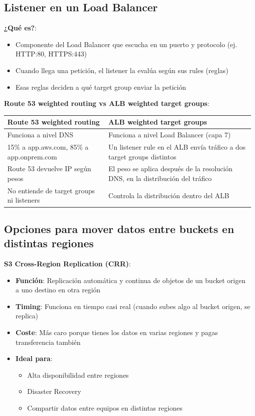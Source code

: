 \documentclass[12pt,a4paper]{report}
\begin{document}
\subsection{Listener en un Load Balancer}

\textbf{¿Qué es?}:
\begin{itemize}
    \item Componente del Load Balancer que escucha en un puerto y protocolo (ej. HTTP:80, HTTPS:443)
    \item Cuando llega una petición, el listener la evalúa según sus rules (reglas)
    \item Esas reglas deciden a qué target group enviar la petición
\end{itemize}

\textbf{Route 53 weighted routing vs ALB weighted target groups}:

\begin{center}
\begin{longtable}{|p{6cm}|p{7cm}|}
\hline
\cellcolor{awsblue!20}\textbf{Route 53 weighted routing} & \cellcolor{awsblue!20}\textbf{ALB weighted target groups} \\
\hline
Funciona a nivel DNS & Funciona a nivel Load Balancer (capa 7) \\
\hline
15\% a app.aws.com, 85\% a app.onprem.com & Un listener rule en el ALB envía tráfico a dos target groups distintos \\
\hline
Route 53 devuelve IP según pesos & El peso se aplica después de la resolución DNS, en la distribución del tráfico \\
\hline
No entiende de target groups ni listeners & Controla la distribución dentro del ALB \\
\hline
\end{longtable}
\end{center}

\subsection{Opciones para mover datos entre buckets en distintas regiones}

\textbf{S3 Cross-Region Replication (CRR)}:
\begin{itemize}
    \item \textbf{Función}: Replicación automática y continua de objetos de un bucket origen a uno destino en otra región
    \item \textbf{Timing}: Funciona en tiempo casi real (cuando subes algo al bucket origen, se replica)
    \item \textbf{Coste}: Más caro porque tienes los datos en varias regiones y pagas transferencia también
    \item \textbf{Ideal para}:
    \begin{itemize}
        \item Alta disponibilidad entre regiones
        \item Disaster Recovery
        \item Compartir datos entre equipos en distintas regiones
    \end{itemize}
\end{itemize}
\end{document}
